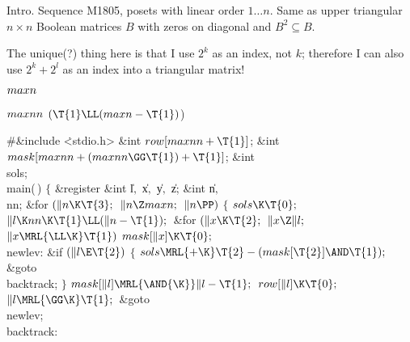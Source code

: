 
\datethis

Intro. Sequence M1805, posets with linear order $1\ldots n$.
Same as upper triangular $n\times n$ Boolean matrices $B$
with zeros on diagonal and $B^2\subseteq B$.

The unique(?) thing here is that I use $2^k$ as an index, not $k$;
therefore I can also use $2^k+2^l$ as an index into a triangular matrix!

\Y\B\4\D$\\{maxn}$ \5
\par
\B\4\D$\\{maxnn}$ \5
$(\T{1}\LL(\\{maxn}-\T{1}){}$)\par
\Y\B\8\#\&{include} \.{<stdio.h>}\6
\&{int} ${}\\{row}[\\{maxnn}+\T{1}]{}$;\6
\&{int} ${}\\{mask}[\\{maxnn}+(\\{maxnn}\GG\T{1})+\T{1}]{}$;\6
\&{int} \\{sols};\7
\\{main}(\,)\1\1\2\2\6
${}\{{}$\1\6
\&{register} \&{int} \|l${},{}$ \|x${},{}$ \|y${},{}$ \|z;\6
\&{int} \|n${},{}$ \\{nn};\7
\&{for} ${}(\|n\K\T{3};{}$ ${}\|n\Z\\{maxn};{}$ ${}\|n\PP){}$\5
${}\{{}$\1\6
${}\\{sols}\K\T{0};{}$\6
${}\|l\K\\{nn}\K\T{1}\LL(\|n-\T{1});{}$\6
\&{for} ${}(\|x\K\T{2};{}$ ${}\|x\Z\|l;{}$ ${}\|x\MRL{{\LL}{\K}}\T{1}){}$\1\5
${}\\{mask}[\|x]\K\T{0};{}$\2\6
\4\\{newlev}:\5
\&{if} ${}(\|l\E\T{2}){}$\5
${}\{{}$\1\6
${}\\{sols}\MRL{+{\K}}\T{2}-(\\{mask}[\T{2}]\AND\T{1});{}$\6
\&{goto} \\{backtrack};\6
\4${}\}{}$\2\6
${}\\{mask}[\|l]\MRL{\AND{\K}}\|l-\T{1};{}$\6
${}\\{row}[\|l]\K\T{0};{}$\6
${}\|l\MRL{{\GG}{\K}}\T{1};{}$\6
\&{goto} \\{newlev};\6
\4\\{backtrack}:\5
